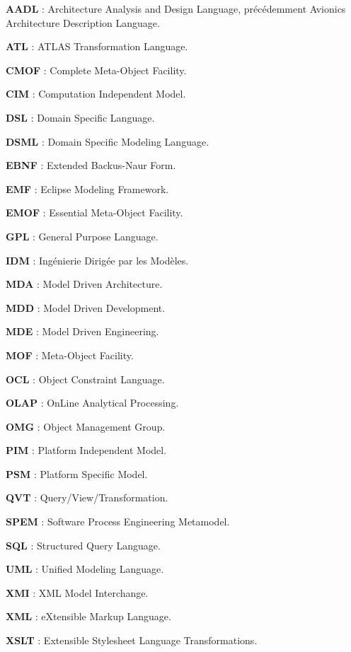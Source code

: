 \begin{TheGlossary}
  \item {\bf AADL} : Architecture Analysis and Design Language, précédemment Avionics Architecture Description Language.
  \item {\bf ATL} : ATLAS Transformation Language.
  \item {\bf CMOF} : Complete Meta-Object Facility.
  \item {\bf CIM} : Computation Independent Model.
  \item {\bf DSL} : Domain Specific Language.
  \item {\bf DSML} : Domain Specific Modeling Language.
  \item {\bf EBNF} : Extended Backus-Naur Form.
  \item {\bf EMF} : Eclipse Modeling Framework.
  \item {\bf EMOF} : Essential Meta-Object Facility.
  \item {\bf GPL} : General Purpose Language.
  \item {\bf IDM} : Ingénierie Dirigée par les Modèles.
  \item {\bf MDA} : Model Driven Architecture.
  \item {\bf MDD} : Model Driven Development.
  \item {\bf MDE} : Model Driven Engineering.
  \item {\bf MOF} : Meta-Object Facility.
  \item {\bf OCL} : Object Constraint Language.
  \item {\bf OLAP} : OnLine Analytical Processing.
  \item {\bf OMG} : Object Management Group.
  \item {\bf PIM} : Platform Independent Model.
  \item {\bf PSM} : Platform Specific Model.
  \item {\bf QVT} : Query/View/Transformation.
  \item {\bf SPEM} : Software Process Engineering Metamodel.
  \item {\bf SQL} : Structured Query Language.
  \item {\bf UML} : Unified Modeling Language.
  \item {\bf XMI} : XML Model Interchange.
  \item {\bf XML} : eXtensible Markup Language.
  \item {\bf XSLT} : Extensible Stylesheet Language Transformations.
\end{TheGlossary}
